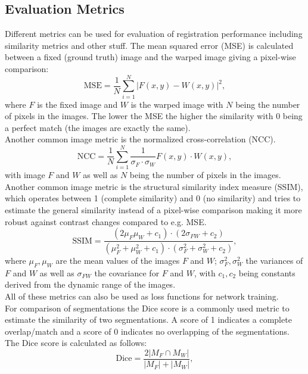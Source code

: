 \documentclass[english,version-2022-01]{uzl-thesis} %
\begin{document}
\subsection{Evaluation Metrics} \label{SubSec:EvalutionMetrics}
Different metrics can be used for evaluation of registration performance including similarity metrics and other stuff. The mean squared error (MSE) is calculated between a fixed (ground truth) image and the warped image giving a pixel-wise comparison:
\begin{equation}
	\text{MSE} = \frac{1}{N} \sum_{i=1}^{N} |F(x,y) - W(x,y)|^2,
\end{equation}
where $F$ is the fixed image and $W$ is the warped image with $N$ being the number of pixels in the images. The lower the MSE the higher the similarity with 0 being a perfect match (the images are exactly the same).\\
Another common image metric is the normalized cross-correlation (NCC). 
\begin{equation}
	\text{NCC} = \frac{1}{N} \sum_{i=1}^{N} \frac{1}{\sigma_F \cdot \sigma_W} F(x,y) \cdot W(x,y),
\end{equation}
with image $F$ and $W$ as well as $N$ being the number of pixels in the images. \\
Another common image metric is the structural similarity index measure (SSIM), which operates between 1 (complete similarity) and 0 (no similarity) and tries to estimate the general similarity instead of a pixel-wise comparison making it more robust against contrast changes compared to e.g. MSE.
\begin{equation}
	\text{SSIM} = \frac{(2 \mu_F \mu_W + c_1) \cdot (2 \sigma_{FW} + c_2)}{(\mu_F^2 + \mu_W^2 + c_1) \cdot (\sigma_F^2 + \sigma_W^2 + c_2) },
\end{equation}
where $\mu_F, \mu_W$ are the mean values of the images $F$ and $W$; $\sigma_F^2, \sigma_W^2$ the variances of $F$ and $W$ as well as $\sigma_{FW}$ the covariance for $F$ and $W$, with $c_1, c_2$ being constants derived from the dynamic range of the images. \\
All of these metrics can also be used as loss functions for network training.\\
For comparison of segmentations the Dice score is a commonly used metric to estimate the similarity of two segmentations. A score of 1 indicates a complete overlap/match and a score of 0 indicates no overlapping of the segmentations. The Dice score is calculated as follows:
\begin{equation}
	\text{Dice} = \frac{2 |M_F \cap M_W|}{|M_F| + |M_W|},
\end{equation}
\end{document}
